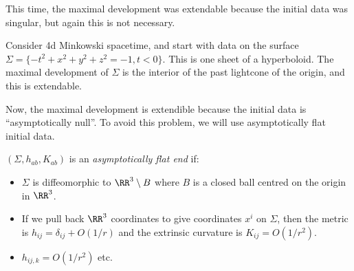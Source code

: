 \documentclass{jknotes}
\begin{document}
This time, the maximal development was extendable because the initial data was singular, but again this is not necessary.
\begin{eg}
    Consider 4d Minkowski spacetime, and start with data on the surface \(\Sigma = \{-t^2+x^2+y^2+z^2 = -1, t < 0\}\). This is one sheet of a hyperboloid. The maximal development of \(\Sigma\) is the interior of the past lightcone of the origin, and this is extendable.
    \begin{figure}[H]
        \centering
    \end{figure}
\end{eg}
Now, the maximal development is extendible because the initial data is ``asymptotically null''. To avoid this problem, we will use asymptotically flat initial data.

\begin{defn}
    \((\Sigma,h_{ab},K_{ab})\) is an \emph{asymptotically flat end} if:
    \begin{itemize}
        \item \(\Sigma\) is diffeomorphic to \(\RR^3\setminus B\) where \(B\) is a closed ball centred on the origin in \(\RR^3\).
        \item If we pull back \(\RR^3\) coordinates to give coordinates \(x^i\) on \(\Sigma\), then the metric is \(h_{ij} = \delta_{ij} + O(1/r)\) and the extrinsic curvature is \(K_{ij} = O(1/r^2)\).
        \item \(h_{ij,k} = O(1/r^2)\) etc.
    \end{itemize}
\end{defn}
\end{document}
